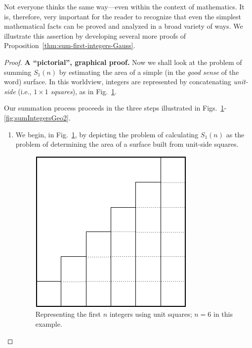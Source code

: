 \bigskip

Not everyone thinks the same way---even within the context of mathematics.  It is, therefore, very important for the reader to recognize that even the simplest mathematical facts can be proved and analyzed in a broad variety of ways.  We illustrate this assertion by developing several more proofs of Proposition~\ref{thm:sum-first-integers-Gauss}.

\begin{proof}
{\bf A ``pictorial'', graphical proof.}
Now we shall look at the problem of summing $S_1(n)$ by estimating the area of a simple (in the \textit{good sense} of the word) surface.  In this worldview, integers are represented by concatenating {\it unit-side} (i.e., $1 \times 1$ {\it squares}), as in Fig.~\ref{fig:sumIntegersGeo1}.

\smallskip

Our summation process proceeds in the three steps illustrated in Figs.~\ref{fig:sumIntegersGeo1}-\ref{fig:sumIntegersGeo2}.
\begin{enumerate}
\item
We begin, in Fig.~\ref{fig:sumIntegersGeo1}, by depicting the problem of calculating $S_1(n)$ as the problem of determining the area of a surface built from unit-side squares.
\begin{figure}[htb]
\begin{center}
       \includegraphics[scale=0.33]{FiguresMaths/SumIntegersGeometricBasis}
\caption{Representing the first $n$ integers using unit squares; $n=6$ in this example.}
       \label{fig:sumIntegersGeo1}
\end{center}
\end{figure}


\end{enumerate}
\end{proof}
